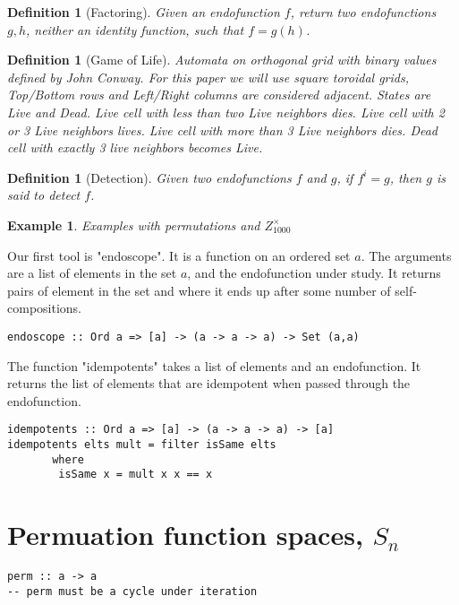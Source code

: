 \documentclass{article}
\newtheorem{defn}[thm]{Definition}
\newtheorem{exam}[thm]{Example}
\begin{document}
\begin{defn}[Factoring] Given an endofunction $f$, return two endofunctions $g,h$, neither an identity function, such that $ f = g(h)$.\end{defn}


\begin{defn}[Game of Life] Automata on orthogonal grid with binary values defined by John Conway. For this paper we will use square toroidal grids, Top/Bottom rows and Left/Right columns are considered adjacent. 
States are Live and Dead. Live cell with less than two Live neighbors dies. Live cell with 2 or 3 Live neighbors lives.  Live cell with more than 3 Live neighbors dies. Dead cell with exactly 3 live neighbors becomes Live.\end{defn} 

\begin{defn}[Detection] Given two endofunctions $f$ and $g$, if $f^{i} = g$, then $g$ is said to detect $f$. \end{defn}


\begin{exam} Examples with permutations and $Z_{1000}^{\times}$\end{exam}


Our first tool is "endoscope". It is a function on an ordered set $a$. The arguments are a list of elements in the set $a$, and the endofunction under study. It returns pairs of element in the set and where it ends up after some number of self-compositions.
\begin{lstlisting}
endoscope :: Ord a => [a] -> (a -> a -> a) -> Set (a,a)
\end{lstlisting}


The function "idempotents" takes a list of elements and an endofunction. It returns the list of elements that are idempotent when passed through the endofunction.
\begin{lstlisting}
idempotents :: Ord a => [a] -> (a -> a -> a) -> [a]
idempotents elts mult = filter isSame elts 
       where
        isSame x = mult x x == x 
\end{lstlisting}







\section{Permuation function spaces, $S_{n}$}

\begin{lstlisting}
perm :: a -> a
-- perm must be a cycle under iteration 
\end{lstlisting}
\end{document}
